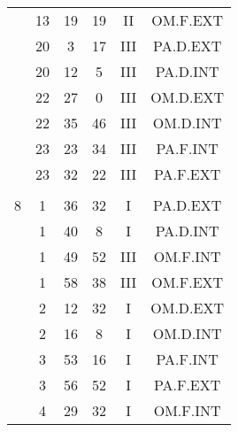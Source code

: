 \documentclass[12pt, a4paper]{article}
\begin{document}
\begin{multicols}{3}
{\begin{tabular}{c c c c c c}
	 	 	 	 & 13 & 19 & 19 & II & OM.F.EXT\\%
	 	 	 	 & 20 & 3 & 17 & III & PA.D.EXT\\%
	 	 	 	 & 20 & 12 & 5 & III & PA.D.INT\\%
	 	 	 	 & 22 & 27 & 0 & III & OM.D.EXT\\%
	 	 	 	 & 22 & 35 & 46 & III & OM.D.INT\\%
	 	 	 	 & 23 & 23 & 34 & III & PA.F.INT\\%
	 	 	 	 & 23 & 32 & 22 & III & PA.F.EXT\\%
	 	 	 	 & & & & & \\%
	 	 	 	8 & 1 & 36 & 32 & I & PA.D.EXT\\%
	 	 	 	 & 1 & 40 & 8 & I & PA.D.INT\\%
	 	 	 	 & 1 & 49 & 52 & III & OM.F.INT\\%
	 	 	 	 & 1 & 58 & 38 & III & OM.F.EXT\\%
	 	 	 	 & 2 & 12 & 32 & I & OM.D.EXT\\%
	 	 	 	 & 2 & 16 & 8 & I & OM.D.INT\\%
	 	 	 	 & 3 & 53 & 16 & I & PA.F.INT\\%
	 	 	 	 & 3 & 56 & 52 & I & PA.F.EXT\\%
	 	 	 	 & 4 & 29 & 32 & I & OM.F.INT\\%
	 	 \end{tabular}
 	}
\end{multicols}
\end{document}
